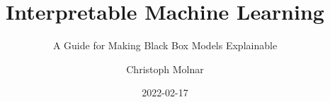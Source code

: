 \documentclass[
  11pt,
]{scrbook}
\title{Interpretable Machine Learning}
\subtitle{A Guide for Making Black Box Models Explainable}
\author{Christoph Molnar}
\date{2022-02-17}
\begin{document}
\maketitle

\thispagestyle{empty}

\end{document}
